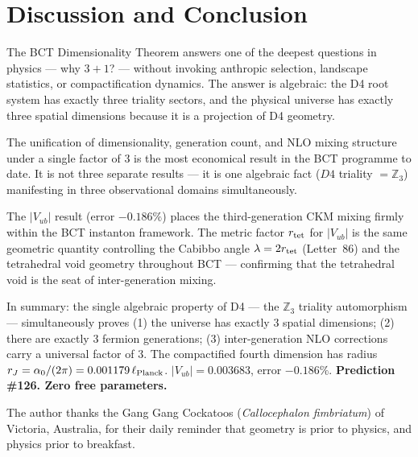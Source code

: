 \documentclass[aps,prl,twocolumn,showpacs,superscriptaddress]{revtex4-2}
\begin{document}
\section{Discussion and Conclusion}

The BCT Dimensionality Theorem answers one of the deepest questions in
physics --- why $3{+}1$? --- without invoking anthropic selection,
landscape statistics, or compactification dynamics. The answer is
algebraic: the D4 root system has exactly three triality sectors, and
the physical universe has exactly three spatial dimensions because it is
a projection of D4 geometry.

The unification of dimensionality, generation count, and NLO mixing
structure under a single factor of $3$ is the most economical result in
the BCT programme to date. It is not three separate results --- it is
one algebraic fact ($D4$ triality $= \mathbb{Z}_3$) manifesting in
three observational domains simultaneously.

The $|V_{ub}|$ result (error $-0.186\%$) places the third-generation
CKM mixing firmly within the BCT instanton framework. The metric factor
$r_{\rm tet}$ for $|V_{ub}|$ is the same geometric quantity controlling
the Cabibbo angle $\lambda = 2r_{\rm tet}$ (Letter~86) and the
tetrahedral void geometry throughout BCT --- confirming that the
tetrahedral void is the seat of inter-generation mixing.

In summary: the single algebraic property of D4 --- the $\mathbb{Z}_3$
triality automorphism --- simultaneously proves (1) the universe has
exactly $3$ spatial dimensions; (2) there are exactly $3$ fermion
generations; (3) inter-generation NLO corrections carry a universal
factor of $3$. The compactified fourth dimension has radius
$r_J = \alpha_0/(2\pi) = 0.001179\,\ell_{\rm Planck}$.
$|V_{ub}| = 0.003683$, error $-0.186\%$. \textbf{Prediction \#126.
Zero free parameters.}

\begin{acknowledgments}
The author thanks the Gang Gang Cockatoos (\textit{Callocephalon
fimbriatum}) of Victoria, Australia, for their daily reminder that
geometry is prior to physics, and physics prior to breakfast.
\end{acknowledgments}
\end{document}
